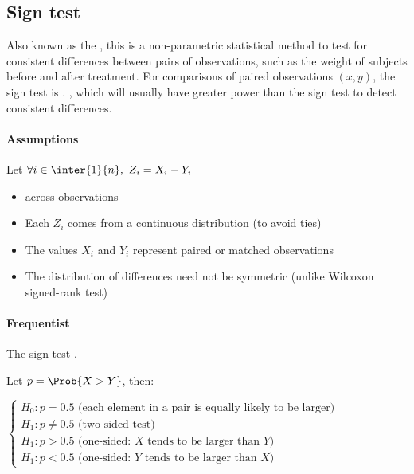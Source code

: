 \subsection{Sign test}

Also known as the , this is a non-parametric statistical method to test
for consistent differences between pairs of observations, such as the weight of subjects before
and after treatment. For comparisons of paired observations $(x, y)$, the sign test is . , which will usually have greater power than the sign test
to detect consistent differences.

\paragraph{Assumptions}
Let $\forall i\in\inter{1}{n},~Z_{i} = X_{i} - Y_{i}$

\begin{itemize}
    \item {} across observations
    \item Each $Z_{i}$ comes from a continuous distribution (to avoid ties)
    \item The values $X_{i}$ and $Y_{i}$ represent paired or matched observations
    \item The distribution of differences need not be symmetric (unlike Wilcoxon signed-rank test)
\end{itemize}

\paragraph{Frequentist}
The sign test .

Let $p=\Prob{X>Y}$, then:

$\begin{cases}
    H_{0}: p=0.5 \text{ (each element in a pair is equally likely to be larger)}\\
    H_{1}: p \neq 0.5 \text{ (two-sided test)}\\
    H_{1}: p > 0.5 \text{ (one-sided: } X \text{ tends to be larger than } Y\text{)}\\
    H_{1}: p < 0.5 \text{ (one-sided: } Y \text{ tends to be larger than } X\text{)}
\end{cases}$

